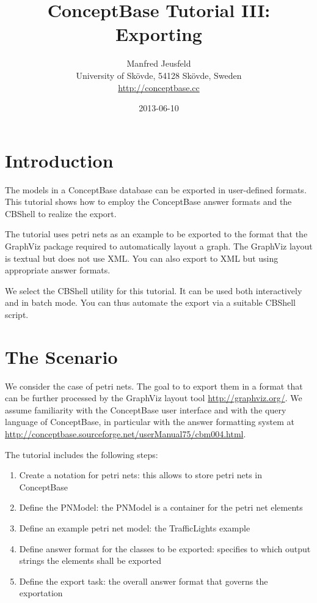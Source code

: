 \documentclass[10pt,a4paper]{article}
\author{
Manfred Jeusfeld\\
{\small University of Sk\"ovde, 54128 Sk\"ovde, Sweden}\\
{\small \url{http://conceptbase.cc}}
}
\title{\bf ConceptBase Tutorial III: Exporting}
\date{2013-06-10}
\begin{document}
\maketitle

\section{Introduction}

The models in a ConceptBase database can be exported in user-defined formats. This
tutorial shows how to employ the ConceptBase answer formats and the CBShell
to realize the export.

The tutorial uses petri nets as an example to be exported to the format
that the GraphViz package required to automatically layout a graph.
The GraphViz layout is textual but does not use XML.
You can also export to XML but using appropriate answer formats.

We select the CBShell utility for this tutorial. It can be used
both interactively and in batch mode. You can thus automate the
export via a suitable CBShell script.

\section{ The Scenario }

We consider the case of petri nets. The goal to to export them in a format
that can be further processed by the GraphViz layout tool
\url{http://graphviz.org/}.
We assume familiarity with the
ConceptBase user interface and with the query language of ConceptBase, in particular with the answer formatting 
system at \url{http://conceptbase.sourceforge.net/userManual75/cbm004.html}.

The tutorial includes the following steps:

\begin{enumerate}
\item Create a notation for petri nets: this allows to store petri nets in ConceptBase
\item Define the PNModel: the PNModel is a container for the petri net elements
\item Define an example petri net model: the TrafficLights example
\item Define answer format for the classes to be exported: specifies to which output strings the elements shall be exported
\item Define the export task: the overall answer format that governs the exportation

\end{enumerate}
\end{document}
